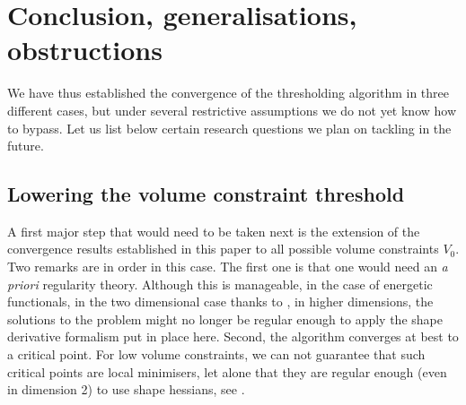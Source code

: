 \documentclass{article}
\renewcommand{\geq}{\geqslant}
\renewcommand{\leq}{\leqslant}
\numberwithin{equation}{section}
\begin{document}
%
%
%
%
%
%
%
%
%
%
\section{Conclusion, generalisations, obstructions}
We have thus established the convergence of the thresholding algorithm in three different cases, but under several restrictive assumptions we do not yet know how to bypass. Let us list below certain research questions we plan on tackling in the future.

\subsection{Lowering the volume constraint threshold}
A first major step that would need to be taken next is the extension of the convergence results established in this paper to all possible volume constraints $V_0$. Two remarks are in order in this case. The first one is that one would need an \emph{a priori} regularity theory. Although this is manageable, in the case of energetic functionals, in the two dimensional case thanks to \cite{Chanillo2008}, in higher dimensions, the solutions to the problem might no longer be regular enough to apply the shape derivative formalism put in place here. Second, the algorithm converges at best to a critical point. For low volume constraints, we can not guarantee that such critical points are local minimisers, let alone that they are regular enough (even in dimension 2) to use shape hessians, see \cite[Remark 3.20]{Chanillo2008bis}.
\end{document}
